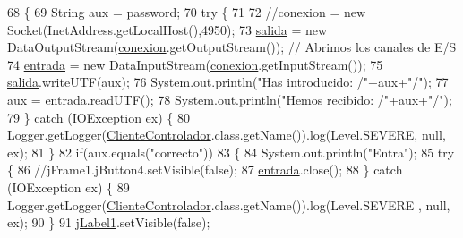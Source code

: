 \begin{DoxyCode}
68         \{
69             String aux = password;
70             \textcolor{keywordflow}{try} \{
71                 
72                 \textcolor{comment}{//conexion = new Socket(InetAddress.getLocalHost(),4950);}
73                 \mbox{\hyperlink{classpecl6part2_1_1_cliente_controlador_a05461ea286f84b5f3f8b82641a5d23af}{salida}}  = \textcolor{keyword}{new} DataOutputStream(\mbox{\hyperlink{classpecl6part2_1_1_cliente_controlador_a4882463501ccc3555c15225ea3076745}{conexion}}.getOutputStream());  \textcolor{comment}{// Abrimos los
       canales de E/S}
74                 \mbox{\hyperlink{classpecl6part2_1_1_cliente_controlador_aaafa871f0ee5e5d481b9ffb65b9a2a8a}{entrada}} = \textcolor{keyword}{new} DataInputStream(\mbox{\hyperlink{classpecl6part2_1_1_cliente_controlador_a4882463501ccc3555c15225ea3076745}{conexion}}.getInputStream());
75                 \mbox{\hyperlink{classpecl6part2_1_1_cliente_controlador_a05461ea286f84b5f3f8b82641a5d23af}{salida}}.writeUTF(aux);
76                 System.out.println(\textcolor{stringliteral}{"Has introducido: /"}+aux+\textcolor{stringliteral}{"/"});
77                 aux = \mbox{\hyperlink{classpecl6part2_1_1_cliente_controlador_aaafa871f0ee5e5d481b9ffb65b9a2a8a}{entrada}}.readUTF();
78                 System.out.println(\textcolor{stringliteral}{"Hemos recibido: /"}+aux+\textcolor{stringliteral}{"/"});
79             \} \textcolor{keywordflow}{catch} (IOException ex) \{
80                 Logger.getLogger(\mbox{\hyperlink{classpecl6part2_1_1_cliente_controlador_a6e526681bd2137858bfb2940eeb23cc8}{ClienteControlador}}.class.getName()).log(Level.SEVERE, 
      null, ex);
81             \}
82             \textcolor{keywordflow}{if}(aux.equals(\textcolor{stringliteral}{"correcto"}))
83             \{
84                 System.out.println(\textcolor{stringliteral}{"Entra"});
85                 \textcolor{keywordflow}{try} \{
86                     \textcolor{comment}{//jFrame1.jButton4.setVisible(false);}
87                     \mbox{\hyperlink{classpecl6part2_1_1_cliente_controlador_aaafa871f0ee5e5d481b9ffb65b9a2a8a}{entrada}}.close();
88                 \} \textcolor{keywordflow}{catch} (IOException ex) \{
89                     Logger.getLogger(\mbox{\hyperlink{classpecl6part2_1_1_cliente_controlador_a6e526681bd2137858bfb2940eeb23cc8}{ClienteControlador}}.class.getName()).log(Level.SEVERE
      , null, ex);
90                 \}
91                 \mbox{\hyperlink{classpecl6part2_1_1_cliente_controlador_a9bc2f24760cd5b88584b4275aa3845db}{jLabel1}}.setVisible(\textcolor{keyword}{false});

\end{DoxyCode}
